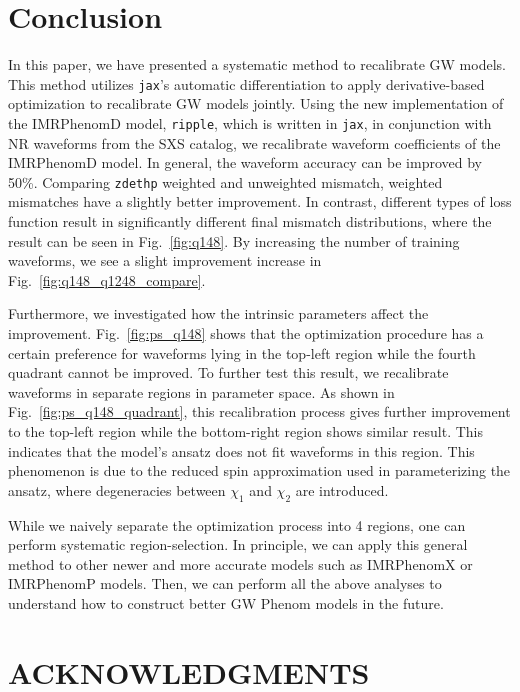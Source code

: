 \documentclass[twocolumn]{aastex631}
\newcommand{\ripple}{\texttt{ripple}}
\newcommand{\jax}{\texttt{jax}}
\newcommand{\zdethp}{\texttt{zdethp}}
\begin{document}

\section{Conclusion} \label{sec:conclusion}

In this paper, we have presented a systematic method to recalibrate GW models.
This method utilizes {\jax}'s automatic differentiation to apply
derivative-based optimization to recalibrate GW models jointly. Using the new
implementation of the IMRPhenomD model, {\ripple}, which is written in \jax, in
conjunction with NR waveforms from the SXS catalog, we recalibrate waveform
coefficients of the IMRPhenomD model. In general, the waveform accuracy can be
improved by 50\%. Comparing {\zdethp} weighted and unweighted mismatch, weighted
mismatches have a slightly better improvement. In contrast, different types of
loss function result in significantly different final mismatch distributions,
where the result can be seen in Fig.~\ref{fig:q148}. By increasing the number of
training waveforms, we see a slight improvement increase in
Fig.~\ref{fig:q148_q1248_compare}. 

Furthermore, we investigated how the intrinsic parameters affect the
improvement. Fig.~\ref{fig:ps_q148} shows that the optimization procedure has a
certain preference for waveforms lying in the top-left region while the fourth
quadrant cannot be improved. To further test this result, we recalibrate
waveforms in separate regions in parameter space. As shown in
Fig.~\ref{fig:ps_q148_quadrant}, this recalibration process gives further
improvement to the top-left region while the bottom-right region shows similar
result. This indicates that the model's ansatz does not fit waveforms in this region. This phenomenon is due to the reduced spin approximation used
in parameterizing the ansatz, where degeneracies between $\chi_1$ and $\chi_2$
are introduced. 

While we naively separate the optimization process into 4 regions, one can
perform systematic region-selection. In principle, we can apply this general
method to other newer and more accurate models such as IMRPhenomX or IMRPhenomP
models. Then, we can perform all the above analyses to understand how to
construct better GW Phenom models in the future.  



\section{ACKNOWLEDGMENTS}



\end{document}
